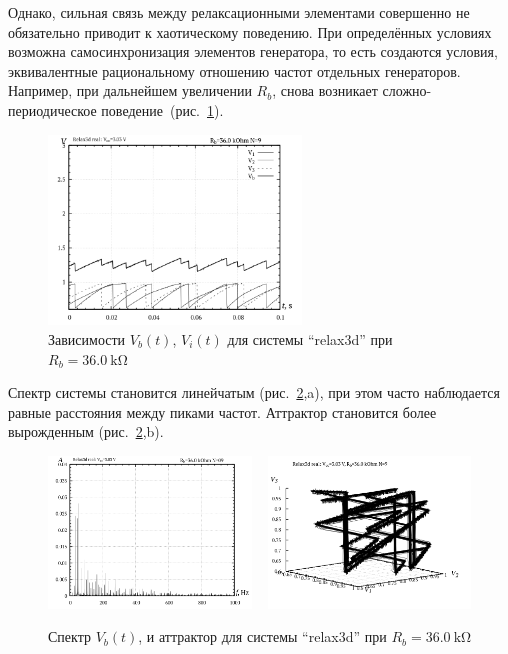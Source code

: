 Однако, сильная связь между релаксационными элементами
совершенно не обязательно приводит к хаотическому поведению.
При определённых условиях возможна самосинхронизация
элементов генератора, то есть создаются условия,
эквивалентные рациональному отношению частот отдельных генераторов.
Например, при дальнейшем увеличении $R_b$, снова
возникает сложно-периодическое поведение~(рис.~\ref{atu:f:relax3d_t_09}).

\begin{figure}[htb!]
  \centerline{\includegraphics[width=0.6\textwidth]{p/relax3d_t_09.png} }
  \caption{Зависимости $V_b(t)$, $V_i(t)$ для системы ``relax3d'' при $R_b=\SI{36.0}{\kilo\ohm}$ }
  \label{atu:f:relax3d_t_09}
\end{figure}

Спектр системы становится линейчатым (рис.~\ref{atu:f:relax3d_f_09},a), при этом
часто наблюдается равные расстояния между пиками частот.
Аттрактор становится более вырожденным (рис.~\ref{atu:f:relax3d_f_09},b).

\begin{figure}[htb!]
  \centerline{
    \includegraphics[width=0.48\textwidth]{p/relax3d_f_09.png}
    ~
    \includegraphics[width=0.48\textwidth]{p/relax3d_v1v2v3_09.png}
  }
  \caption{Спектр $V_b(t)$, и аттрактор для системы ``relax3d'' при $R_b=\SI{36.0}{\kilo\ohm}$ }
  \label{atu:f:relax3d_f_09}
\end{figure}

